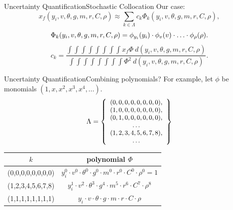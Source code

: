 \documentclass{beamer}
\begin{document}
\begin{frame}{Uncertainty Quantification}{Stochastic Collocation}\vspace{-20pt}
Our case:
\begin{equation*}
x_f(y_i,v,\theta,g,m,r,C,\rho)\approx\sum_{k\in\Lambda}c_k\Phi_k(y_i,v,\theta,g,m,r,C,\rho),
\end{equation*}
\begin{equation*}
\Phi_k(y_i,v,\theta,g,m,r,C,\rho) = \phi_{y_i}(y_i)\cdot\phi_{v}(v)\cdot\ldots\cdot\phi_{\rho}(\rho).\vspace{10pt}
\end{equation*}
\begin{equation*}
c_k = \frac{\int\int\int\int\int\int\int\int x_f\Phi\ d(y_i,v,\theta,g,m,r,C,\rho)}{\int\int\int\int\int\int\int\int \Phi^2\ d(y_i,v,\theta,g,m,r,C,\rho)}.
\end{equation*}
\end{frame}

\begin{frame}{Uncertainty Quantification}{Combining polynomials?}
For example, let $\phi$ be monomials $(1,x,x^2,x^3,x^4,...)$.
\begin{equation*}\small
\Lambda = \left\{
\begin{array}{c}
(0,0,0,0,0,0,0,0), \\
(1,0,0,0,0,0,0,0), \\
(0,1,0,0,0,0,0,0), \\
\ldots \\
(1,2,3,4,5,6,7,8), \\
\ldots \\
\end{array}\right\}
\end{equation*}\normalsize
\begin{table}
\centering
\begin{tabular}{c c}
$k$ & polynomial $\Phi$ \\ \hline
(0,0,0,0,0,0,0,0) &  $y_i^0 \cdot v^0 \cdot \theta^0 \cdot g^0 \cdot m^0 \cdot r^0 \cdot C^0 \cdot \rho^0 = 1$ \\
(1,2,3,4,5,6,7,8) &  $y_i^1 \cdot v^2 \cdot \theta^3 \cdot g^4 \cdot m^5 \cdot r^6 \cdot C^7 \cdot \rho^8$ \\
(1,1,1,1,1,1,1,1) & $ y_i \cdot v \cdot \theta \cdot g \cdot m \cdot r \cdot C \cdot \rho$ \\
\end{tabular}
\end{table}
\end{frame}
\end{document}
